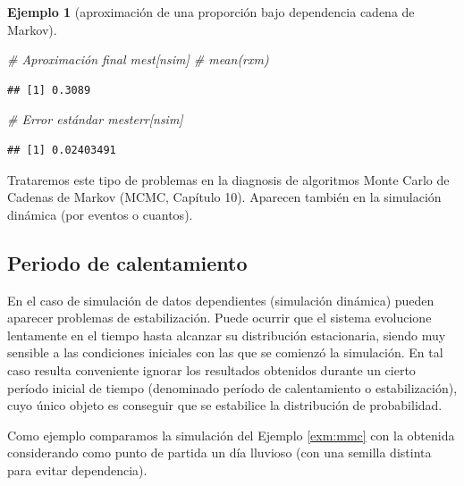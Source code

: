 \documentclass[
]{book}
\newenvironment{Shaded}{\begin{snugshade}}{\end{snugshade}}
\newcommand{\CommentTok}[1]{\textcolor[rgb]{0.56,0.35,0.01}{\textit{#1}}}
\newcommand{\NormalTok}[1]{#1}
\theoremstyle{break}
\newtheorem{example}{Ejemplo}[chapter]
\theoremstyle{nonumberplain}
\begin{document}
\begin{example}[aproximación de una proporción bajo dependencia cadena de Markov]
\begin{Shaded}
\begin{Highlighting}[]
\CommentTok{\# Aproximación final}
\NormalTok{mest[nsim] }\CommentTok{\# mean(rxm)}
\end{Highlighting}
\end{Shaded}

\begin{verbatim}
## [1] 0.3089
\end{verbatim}

\begin{Shaded}
\begin{Highlighting}[]
\CommentTok{\# Error estándar}
\NormalTok{mesterr[nsim]}
\end{Highlighting}
\end{Shaded}

\begin{verbatim}
## [1] 0.02403491
\end{verbatim}

\end{example}

Trataremos este tipo de problemas en la diagnosis de algoritmos Monte Carlo de Cadenas de Markov (MCMC, Capítulo 10).
Aparecen también en la simulación dinámica (por eventos o cuantos).

\hypertarget{periodo-de-calentamiento}{%
\subsection{Periodo de calentamiento}\label{periodo-de-calentamiento}}

En el caso de simulación de datos dependientes (simulación dinámica)
pueden aparecer problemas de estabilización. Puede ocurrir que el sistema
evolucione lentamente en el tiempo hasta alcanzar su distribución estacionaria,
siendo muy sensible a las condiciones iniciales con las que se comienzó la
simulación. En tal caso resulta conveniente ignorar los resultados obtenidos
durante un cierto período inicial de tiempo (denominado período de calentamiento
o estabilización), cuyo único objeto es conseguir que se estabilice la distribución de
probabilidad.

Como ejemplo comparamos la simulación del Ejemplo \ref{exm:mmc} con la obtenida considerando como punto de partida un día lluvioso (con una semilla distinta para evitar dependencia).
\end{document}
